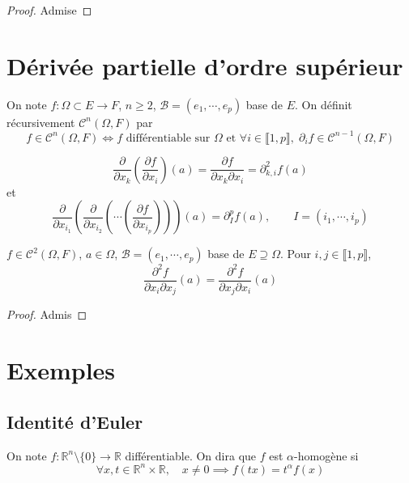 \begin{proof}
    Admise
\end{proof}

\section{Dérivée partielle d'ordre supérieur}

\begin{dfn}
    On note $f:\Omega\subset E\to F$, $n\geq 2$, $\mathcal B=(e_1, \cdots, e_p)$ base de $E$. On définit récursivement $\mathcal C^n(\Omega, F)$ par \[
        f\in\mathcal C^n(\Omega, F)\iff f \text{ différentiable sur }\Omega\text{ et }\forall i\in\llbracket 1, p\rrbracket, \; \partial_i f\in\mathcal C^{n-1}(\Omega, F)
    \]
\end{dfn}

\begin{notation}
    \[
        \frac{\partial}{\partial x_k} \left( \frac{\partial f}{\partial x_i}  \right) (a)= \frac{\partial f}{\partial x_k\partial x_i}=\partial^2_{k,i}f(a) 
    \]
    et \[
        \frac{\partial}{\partial x_{i_1}} \left( \frac{\partial }{\partial x_{i_2}} \left( \cdots \left( \frac{\partial f}{\partial x_{i_p}}  \right)\right)  \right)(a)=\partial^p_I f(a), \qquad I=(i_1, \cdots, i_p)
    \]
\end{notation}

\begin{thm}[Schwarz]
    \Hyp $f\in \mathcal C^2(\Omega, F)$, $a\in \Omega$, $\mathcal B=(e_1, \cdots, e_p)$ base de $E\supseteq \Omega$.
    \Conc Pour $i, j\in\llbracket 1, p\rrbracket$,  \[
        \frac{\partial^2f}{\partial x_i\partial x_j} (a)= \frac{\partial^2f}{\partial x_j\partial x_i} (a)
    \]
\end{thm}

\begin{proof}
    Admis
\end{proof}

\section{Exemples}

\subsection{Identité d'Euler}

On note $f:\mathbb R^n\setminus \{0\}\to \mathbb R$ différentiable. On dira que $f$ est $\alpha$-homogène si \[\forall x, t\in\mathbb R^n\times \mathbb R, \quad x\neq 0 \implies f(tx)=t^\alpha f(x)\]

